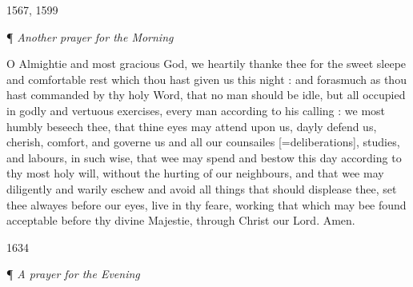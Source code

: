 1567,
1599

¶
\emph{Another prayer for the Morning}

O
Almightie and most gracious God, we heartily thanke thee for the sweet
sleepe and comfortable rest which thou hast given us this night : and
forasmuch as thou hast commanded by thy holy Word, that no man should
be idle, but all occupied in godly and vertuous exercises, every man according
to his calling : we most humbly beseech thee, that thine eyes may attend
upon us, dayly defend us, cherish, comfort, and governe us and all our
counsailes [=deliberations],
studies, and labours, in such wise, that wee may spend and bestow this
day according to thy most holy will, without the hurting of our neighbours,
and that wee may diligently and warily eschew and avoid all things that
should displease thee, set thee alwayes before our eyes, live in thy feare,
working that which may bee found acceptable before thy divine Majestie,
through Christ our Lord. Amen.

1634

¶
\emph{A prayer for the Evening}

